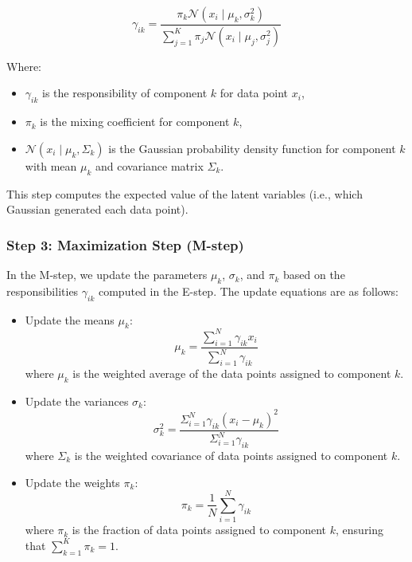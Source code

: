 \documentclass[openany]{book}
\begin{document}
        \[
        \gamma_{ik} = \frac{\pi_k \mathcal{N}(x_i \mid \mu_k, \sigma_k^2)}{\sum_{j=1}^{K} \pi_j \mathcal{N}(x_i \mid \mu_j, \sigma^2_j)}
        \]
        
        Where:
        \begin{itemize}
            \item \( \gamma_{ik} \) is the responsibility of component \( k \) for data point \( x_i \),
            \item \( \pi_k \) is the mixing coefficient for component \( k \),
            \item \( \mathcal{N}(x_i \mid \mu_k, \Sigma_k) \) is the Gaussian probability density function for component \( k \) with mean \( \mu_k \) and covariance matrix \( \Sigma_k \).
        \end{itemize}
        
        This step computes the expected value of the latent variables (i.e., which Gaussian generated each data point).
        
        \subsubsection*{Step 3: Maximization Step (M-step)}
        
        In the M-step, we update the parameters \( \mu_k \), \( \sigma_k \), and \( \pi_k \) based on the responsibilities \( \gamma_{ik} \) computed in the E-step. The update equations are as follows:
        
        \begin{itemize}
            \item Update the means \( \mu_k \):
            \[
            \mu_k = \frac{\sum_{i=1}^{N} \gamma_{ik} x_i}{\sum_{i=1}^{N} \gamma_{ik}}
            \]
            where \( \mu_k \) is the weighted average of the data points assigned to component \( k \).
            
            \item Update the variances \( \sigma_k \):
            \[ \sigma^2_k = \frac{\Sigma_{i=1}^{N} \gamma_{ik}(x_i - \mu_k)^2}{\Sigma_{i=1}^{N} \gamma_{ik}}
            \]
            where \( \Sigma_k \) is the weighted covariance of data points assigned to component \( k \).
            
            \item Update the weights \( \pi_k \):
            \[
            \pi_k = \frac{1}{N} \sum_{i=1}^{N} \gamma_{ik}
            \]
            where \( \pi_k \) is the fraction of data points assigned to component \( k \), ensuring that \( \sum_{k=1}^{K} \pi_k = 1 \).
        \end{itemize}
        
\end{document}
